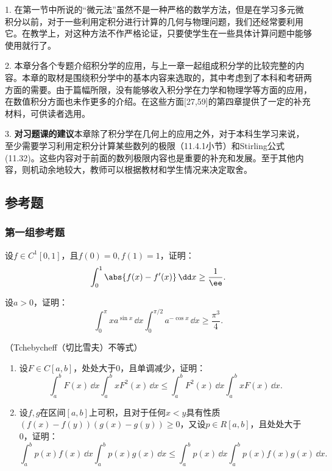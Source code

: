 1. 在第一节中所说的“微元法”虽然不是一种严格的数学方法，但是在学习多元微积分以前，对于一些利用定积分进行计算的几何与物理问题，我们还经常要利用它。在教学上，对这种方法不作严格论证，只要使学生在一些具体计算问题中能够使用就行了。

2. 本章分各个专题介绍积分学的应用，与上一章一起组成积分学的比较完整的内容。本章的取材是围绕积分学中的基本内容来选取的，其中考虑到了本科和考研两方面的需要。由于篇幅所限，没有能够收入积分学在力学和物理学等方面的应用，在数值积分方面也未作更多的介绍。在这些方面[27,59]的第四章提供了一定的补充材料，可供读者选用。

3. \textbf{对习题课的建议}\quad 本章除了积分学在几何上的应用之外，对于本科生学习来说，至少需要学习利用定积分计算某些数列的极限（11.4.1小节）和Stirling公式(11.32)。这些内容对于前面的数列极限内容也是重要的补充和发展。至于其他内容，则机动余地较大，教师可以根据教材和学生情况来决定取舍。

\subsection{参考题}

\subsubsection*{第一组参考题}

\begin{xreferenceproblem}[1]
设$f\in C^1[0,1]$，且$f(0)=0,f(1)=1$，证明：
  \[
    \int_0^1\abs{f(x)-f'(x)}\,\dd x\ge\frac1\ee.
  \]
\end{xreferenceproblem}

\begin{xreferenceproblem}[2]
设$a>0$，证明：
  \[
    \int_0^\pi xa^{\sin x}\,\dd x\int_0^{\pi/2}a^{-\cos x}\,\dd x\ge\frac{\pi^3}{4}.
  \]
\end{xreferenceproblem}

\begin{xreferenceproblem}[3]
（Tchebycheff（切比雪夫）不等式）
  \begin{enumerate}[label=(\arabic*)]
    \item 设$F\in C[a,b]$，处处大于0，且单调减少，证明：
    \[
      \int_a^bF(x)\,\dd x\int_a^bxF^2(x)\,\dd x
      \le\int_a^bF^2(x)\,\dd x\int_a^bxF(x)\,\dd x.
    \]
    \item 设$f,g$在区间$[a,b]$上可积，且对于任何$x<y$具有性质$(f(x)-f(y))(g(x)-g(y))\ge0$，又设$p\in R[a,b]$，且处处大于0，证明：
    \[
      \int_a^bp(x)f(x)\,\dd x\int_a^bp(x)g(x)\,\dd x
      \le\int_a^bp(x)\,\dd x\int_a^bp(x)f(x)g(x)\,\dd x.
    \]
  \end{enumerate}
\end{xreferenceproblem}

